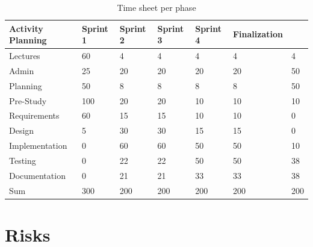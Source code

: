 \documentclass[11pt]{book}
\begin{document}
\begin{table}[H]
\centering
\begin{tabular}{ l | l l l l l l }
    Activity                Planning    & Sprint 1  & Sprint 2  & Sprint 3  & Sprint 4  & Finalization    \\ \hline        
    Lectures                & 60        & 4         & 4         & 4         & 4         & 4               \\ \hline
    Admin                   & 25        & 20        & 20        & 20        & 20        & 50              \\ \hline
    Planning                & 50        & 8         & 8         & 8         & 8         & 50              \\ \hline
    Pre-Study               & 100       & 20        & 20        & 10        & 10        & 10              \\ \hline
    Requirements            & 60        & 15        & 15        & 10        & 10        & 0               \\ \hline
    Design                  & 5         & 30        & 30        & 15        & 15        & 0               \\ \hline
    Implementation          & 0         & 60        & 60        & 50        & 50        & 10              \\ \hline
    Testing                 & 0         & 22        & 22        & 50        & 50        & 38              \\ \hline
    Documentation           & 0         & 21        & 21        & 33        & 33        & 38              \\ \hline
    Sum                     & 300       & 200       & 200       & 200       & 200       & 200
\end{tabular}
\caption{Time sheet per phase}
\label{tab:plan_time_per_phase}
\end{table}

\section{Risks}\label{sec:project_risk_assessment}
\end{document}
